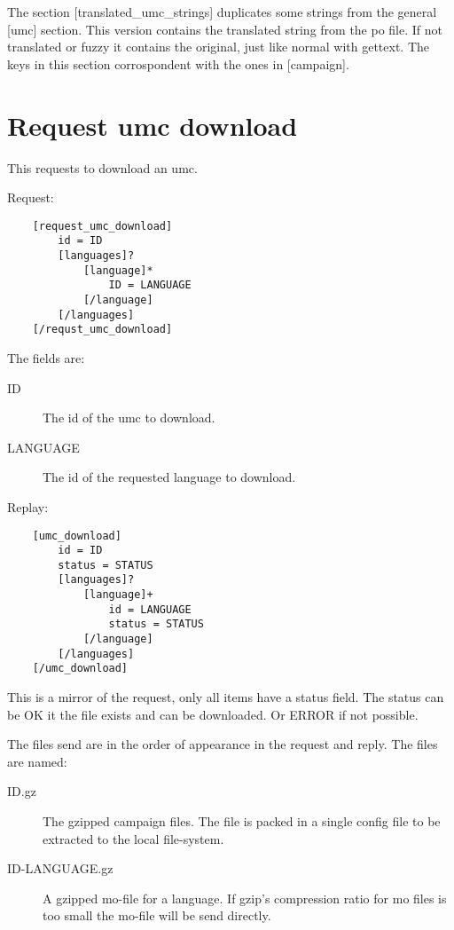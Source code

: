 The section [translated\_umc\_strings] duplicates some strings from the
general [umc] section. This version contains the translated string from
the po file. If not translated or fuzzy it contains the original, just like
normal with gettext. The keys in this section corrospondent with the ones in
[campaign].

\section{Request umc download}
\label{wire:request_umc_download}

This requests to download an umc.

Request:
\begin{lstlisting}
	[request_umc_download]
		id = ID
		[languages]?
			[language]*
				ID = LANGUAGE
			[/language]
		[/languages]
	[/requst_umc_download]
\end{lstlisting}

The fields are:
\begin{description}
\item[ID]
	The id of the umc to download.

\item[LANGUAGE]
	The id of the requested language to download.

\end{description}

Replay:
\begin{lstlisting}
	[umc_download]
		id = ID
		status = STATUS
		[languages]?
			[language]+
				id = LANGUAGE
				status = STATUS
			[/language]
		[/languages]
	[/umc_download]
\end{lstlisting}

This is a mirror of the request, only all items have a status field. The
status can be OK it the file exists and can be downloaded. Or ERROR if not
possible.

The files send are in the order of appearance in the request and reply. The
files are named:
\begin{description}
\item[ID.gz]
	The gzipped campaign files. The file is packed in a single config file
	to be extracted to the local file-system.

\item[ID-LANGUAGE.gz]
	A gzipped mo-file for a language. If gzip's compression ratio for mo
	files is too small the mo-file will be send directly.

\end{description}


